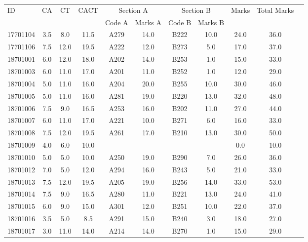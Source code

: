 \documentclass[12pt]{article}
\begin{document}
    \begin{center} 
	\renewcommand{\arraystretch}{1.08}
	\begin{small}
    \begin{tabular}{|l|c|c|c|c|c|c|c|c|c|c|} \hline
	\multirow{2}{*}{ID} & 	\multirow{2}{*}{CA}  & 	\multirow{2}{*}{CT}  & 	\multirow{2}{*}{CACT}  & \multicolumn{2 }{|c|}{Section A}& \multicolumn{2 }{c|}{Section B} & 	\multirow{2}{*}{Marks}  & 	\multirow{2}{*}{Total Marks}  \\ 
	&  &  &  & Code A & Marks A & Code B & Marks B&  &  \\ \hline
17701104 & 3.5 & 8.0 & 11.5 & A279 & 14.0 & B222 & 10.0 & 24.0 & 36.0\\ \hline 
17701106 & 7.5 & 12.0 & 19.5 & A222 & 12.0 & B273 & 5.0 & 17.0 & 37.0\\ \hline 
18701001 & 6.0 & 12.0 & 18.0 & A202 & 14.0 & B253 & 1.0 & 15.0 & 33.0\\ \hline 
18701003 & 6.0 & 11.0 & 17.0 & A201 & 11.0 & B252 & 1.0 & 12.0 & 29.0\\ \hline 
18701004 & 5.0 & 11.0 & 16.0 & A204 & 20.0 & B255 & 10.0 & 30.0 & 46.0\\ \hline 
18701005 & 5.0 & 11.0 & 16.0 & A281 & 19.0 & B220 & 13.0 & 32.0 & 48.0\\ \hline 
18701006 & 7.5 & 9.0 & 16.5 & A253 & 16.0 & B202 & 11.0 & 27.0 & 44.0\\ \hline 
18701007 & 6.0 & 11.0 & 17.0 & A221 & 10.0 & B271 & 6.0 & 16.0 & 33.0\\ \hline 
18701008 & 7.5 & 12.0 & 19.5 & A261 & 17.0 & B210 & 13.0 & 30.0 & 50.0\\ \hline 
18701009 & 4.0 & 6.0 & 10.0 &  &  &  &  & 0.0 & 10.0\\ \hline 
18701010 & 5.0 & 5.0 & 10.0 & A250 & 19.0 & B290 & 7.0 & 26.0 & 36.0\\ \hline 
18701012 & 7.0 & 5.0 & 12.0 & A294 & 16.0 & B243 & 5.0 & 21.0 & 33.0\\ \hline 
18701013 & 7.5 & 12.0 & 19.5 & A205 & 19.0 & B256 & 14.0 & 33.0 & 53.0\\ \hline 
18701014 & 7.5 & 9.0 & 16.5 & A280 & 11.0 & B221 & 13.0 & 24.0 & 41.0\\ \hline 
18701015 & 6.0 & 9.0 & 15.0 & A301 & 12.0 & B251 & 10.0 & 22.0 & 37.0\\ \hline 
18701016 & 3.5 & 5.0 & 8.5 & A291 & 15.0 & B240 & 3.0 & 18.0 & 27.0\\ \hline 
18701017 & 3.0 & 11.0 & 14.0 & A214 & 14.0 & B270 & 1.0 & 15.0 & 29.0\\ \hline 

\end{tabular}
\end{small}
\end{center}
\end{document}
